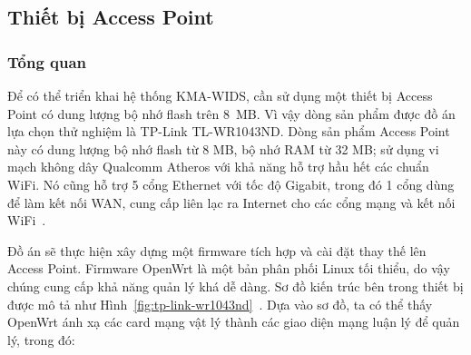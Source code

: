 \subsection{Thiết bị Access Point}
\subsubsection{Tổng quan}
Để có thể triển khai hệ thống KMA-WIDS, cần sử dụng một thiết bị Access Point có dung lượng bộ nhớ flash trên 8~MB. Vì vậy dòng sản phẩm được đồ án lựa chọn thử nghiệm là TP-Link TL-WR1043ND. Dòng sản phẩm Access Point này có dung lượng bộ nhớ flash từ 8 MB, bộ nhớ RAM từ 32 MB; sử dụng vi mạch không dây Qualcomm Atheros với khả năng hỗ trợ hầu hết các chuẩn WiFi. Nó cũng hỗ trợ 5 cổng Ethernet với tốc độ Gigabit, trong đó 1 cổng dùng để làm kết nối WAN, cung cấp liên lạc ra Internet cho các cổng mạng và kết nối WiFi~\cite{openwrt2017tplink}. 

Đồ án sẽ thực hiện xây dựng một firmware tích hợp và cài đặt thay thế lên Access Point. Firmware OpenWrt là một bản phân phối Linux tối thiểu, do vậy chúng cung cấp khả năng quản lý khá dễ dàng. Sơ đồ kiến trúc bên trong thiết bị được mô tả như Hình~\ref{fig:tp-link-wr1043nd}~\cite{openwrt2017tplink}. Dựa vào sơ đồ, ta có thể thấy OpenWrt ánh xạ các card mạng vật lý thành các giao diện mạng luận lý để quản lý, trong đó:

